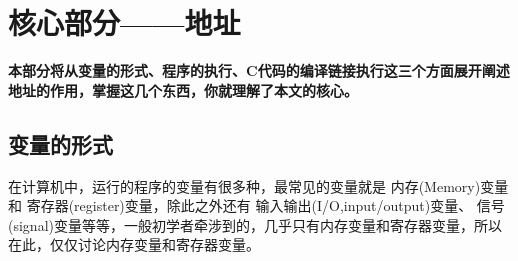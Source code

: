 \documentclass[11pt,twoside,a4paper,titlepage]{article}	%
\newcommand{\yihao}{\fontsize{26pt}{36pt}\selectfont}       %
\newcommand{\sanhao}{\fontsize{16pt}{24pt}\selectfont}      %
\newcommand{\sihao}{\fontsize{14pt}{21pt}\selectfont}		%
\newcommand{\kw}[1]{\textcolor[rgb]{0.0,0.0,0.63}{ #1}}
\begin{document}
\newpage
\pagestyle{fancy}
\setcounter{page}{1}
\newcommand\secformat[1]{%
	\parbox[b]{.5\textwidth}{\yihao{\filleft\bfseries #1}}%
  	\quad\rule[-12pt]{2pt}{70pt}\quad
  	{\fontsize{60}{60}\selectfont\thesection}}
\titleformat{\section}[block]
  {\filleft\normalfont\sffamily}{}{0pt}{\secformat}
[1pc]

\newcommand{\subsecformat}[1]{\sanhao{\textbf{\thesubsection{}\ }\bfseries #1}}
\titleformat{\subsection}[block]{}{}{0pt}{\subsecformat}
[1pc]


\newcommand{\subsubsecformat}[1]{\sihao{\textbf{\thesubsubsection{}\ }\bfseries #1}}
\titleformat{\subsubsection}[block]{}{}{0pt}{\subsubsecformat}
[1pc]


\newpage
\setcounter{page}{1}

\section{核心部分——地址}

\textbf{本部分将从变量的形式、程序的执行、C代码的编译链接执行这三个方面展开阐述地址的作用，掌握这几个东西，你就理解了本文的核心。}

\subsection{变量的形式}
在计算机中，运行的程序的变量有很多种，最常见的变量就是\kw{内存(Memory)}变量和\kw{寄存器(register)}变量，除此之外还有\kw{输入输出(I/O,input/output)}变量、\kw{信号(signal)}变量等等，一般初学者牵涉到的，几乎只有内存变量和寄存器变量，所以在此，仅仅讨论内存变量和寄存器变量。
\end{document}
